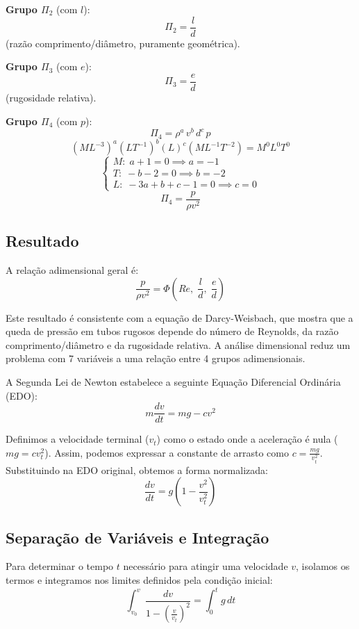 \textbf{Grupo $\Pi_2$} (com $l$):
\[
\Pi_2 = \frac{l}{d}
\]
(razão comprimento/diâmetro, puramente geométrica).

\textbf{Grupo $\Pi_3$} (com $e$):
\[
\Pi_3 = \frac{e}{d}
\]
(rugosidade relativa).

\textbf{Grupo $\Pi_4$} (com $p$):
\[
\Pi_4 = \rho^a\, v^b\, d^c\, p
\]
\[
(M L^{-3})^a (L T^{-1})^b (L)^c (M L^{-1} T^{-2}) = M^0 L^0 T^0
\]
\[
\begin{cases} M:\; a + 1 = 0 \implies a = -1 \\ T:\; -b - 2 = 0 \implies b = -2 \\ L:\; -3a + b + c - 1 = 0 \implies c = 0 \end{cases}
\]
\[
\Pi_4 = \frac{p}{\rho v^2}
\]

\subsection*{Resultado}

A relação adimensional geral é:
\[
\frac{p}{\rho v^2} = \Phi\!\left(Re,\; \frac{l}{d},\; \frac{e}{d}\right)
\]

Este resultado é consistente com a equação de Darcy-Weisbach, que mostra que a queda de pressão em tubos rugosos depende do número de Reynolds, da razão comprimento/diâmetro e da rugosidade relativa. A análise dimensional reduz um problema com 7 variáveis a uma relação entre 4 grupos adimensionais.

A Segunda Lei de Newton estabelece a seguinte Equação Diferencial Ordinária (EDO):
\begin{equation}
    m \frac{dv}{dt} = mg - cv^2
\end{equation}

Definimos a velocidade terminal ($v_t$) como o estado onde a aceleração é nula ($mg = cv_t^2$). Assim, podemos expressar a constante de arrasto como $c = \frac{mg}{v_t^2}$. Substituindo na EDO original, obtemos a forma normalizada:
\begin{equation}
    \frac{dv}{dt} = g \left( 1 - \frac{v^2}{v_t^2} \right)
\end{equation}

\subsection*{Separação de Variáveis e Integração}
Para determinar o tempo $t$ necessário para atingir uma velocidade $v$, isolamos os termos e integramos nos limites definidos pela condição inicial:
\begin{equation}
    \int_{v_0}^{v} \frac{dv}{1 - \left( \frac{v}{v_t} \right)^2} = \int_{0}^{t} g \, dt
\end{equation}

